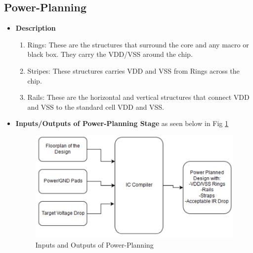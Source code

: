\documentclass[../main.tex]{subfiles}
\begin{document}
 		
    \subsection{Power-Planning}
\begin{itemize}
\item \textbf{Description} 
\begin{enumerate}
\item  Rings: These are the structures that surround the core and any macro or black box. They carry the VDD/VSS around the chip.
\item Stripes: These structures carries VDD and VSS from Rings across the chip.
\item Rails: These are the horizontal and vertical structures that connect VDD and VSS to the standard cell VDD and VSS.
\end{enumerate}

\item  \textbf{Inputs/Outputs of Power-Planning Stage} 
as seen below in Fig \ref{fig:IO_power}
\begin{figure}[h]
\centering
\includegraphics[width=17cm]{diagrams/IO_power.PNG}
\caption{ Inputs and Outputs of Power-Planning}
\label{fig:IO_power}
\end{figure}
\end{itemize}
\end{document}
